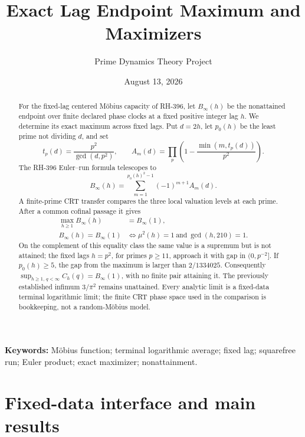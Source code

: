 \documentclass[12pt,a4paper]{article}
\title{Exact Lag Endpoint Maximum and Maximizers}
\author{Prime Dynamics Theory Project}
\date{August 13, 2026}
\theoremstyle{definition}
\newcommand{\mob}{\mu}
\newcommand{\Bin}{B_\infty}
\begin{document}
\maketitle

\begin{abstract}
For the fixed-lag centered M\"obius capacity of RH-396, let
\(B_\infty(h)\) be the nonattained endpoint over finite declared phase
clocks at a fixed positive integer lag \(h\).  We determine its exact maximum
across fixed lags.  Put \(d=2h\), let \(p_0(h)\) be the least prime not
dividing \(d\), and set
\[
 t_p(d)=\frac{p^2}{\gcd(d,p^2)},\qquad
 A_m(d)=\prod_p\left(1-\frac{\min(m,t_p(d))}{p^2}\right).
\]
The RH-396 Euler--run formula telescopes to
\[
 \Bin(h)=\sum_{m=1}^{p_0(h)^2-1}(-1)^{m+1}A_m(d).
\]
A finite-prime CRT transfer compares the three local valuation levels at each
prime.  After a common cofinal passage it gives
\begin{align*}
 \max_{h\geq1}\Bin(h)&=\Bin(1),\\
 \Bin(h)=\Bin(1)
 &\Longleftrightarrow
 \mob^2(h)=1\ \text{and}\ \gcd(h,210)=1.
\end{align*}
On the complement of this equality class the same value is a supremum but is
not attained; the fixed lags \(h=p^2\), for primes \(p\geq11\), approach it
with gap in \((0,p^{-2}]\).  If \(p_0(h)\geq5\), the gap from the maximum is
larger than \(2/1334025\).  Consequently
\(\sup_{h\geq1,\,q<\infty}C_h(q)=\Bin(1)\), with no finite pair attaining it.
The previously established infimum \(3/\pi^2\) remains unattained.  Every
analytic limit is a fixed-data terminal logarithmic limit; the finite CRT
phase space used in the comparison is bookkeeping, not a random-M\"obius
model.
\end{abstract}

\noindent\textbf{Keywords:} M\"obius function; terminal logarithmic average;
fixed lag; squarefree run; Euler product; exact maximizer; nonattainment.

\section{Fixed-data interface and main results}
\end{document}
